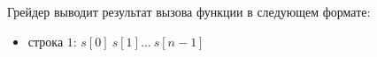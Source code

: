 Грейдер выводит результат вызова функции в следующем формате:
\begin{itemize}
\item строка $1$: $s[0]\ s[1]\ldots \ s[n-1]$
\end{itemize}
